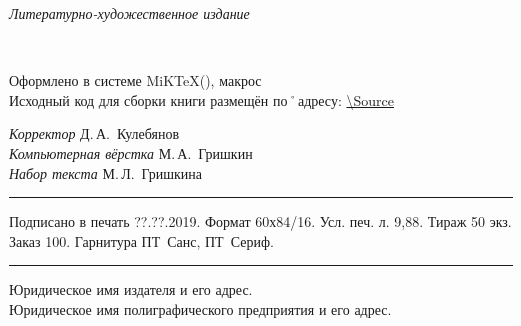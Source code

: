 ﻿\clearpage

\thispagestyle{empty}
\noindent\begin{center}
	{\itshape Литературно-художественное издание\par}
\end{center}	
\vfill\noindent
\begin{center}
	{\large{\bfseries\MakeUppercase{\AuthorFam}} \AuthorName\\[3ex]}	
	{\LARGE\Title}
\end{center}

\vfill\noindent
\begin{center}
	Оформлено в системе MiK\TeX(\LaTeXe), макрос \KOMAScript\\[1ex]
	Исходный код для сборки книги размещён по˚адресу: \footnotesize\url{\Source}
\end{center}
	
\vfill\noindent
\begin{center}
	\small 
	{\itshape Корректор} Д.\,А.~Кулебянов\\[1ex]
	{\itshape Компьютерная вёрстка} М.\,А.~Гришкин\\[1ex]
	{\itshape Набор текста} М.\,Л.~Гришкина\\[1ex]
\end{center}

\vfill\noindent
\rule{\textwidth}{.5pt}
\begin{center}
	\small Подписано в печать  ??.??.2019. Формат 60х84/16. Усл. печ. л. 9,88. Тираж 50 экз. Заказ 100. Гарнитура ПТ~Санс, ПТ~Сериф.		
\end{center}
\rule{\textwidth}{.5pt}

\vfil\noindent		
\begin{center}
		\small
		
		Юридическое имя издателя и его адрес.\\[1ex]
				
		Юридическое имя полиграфического предприятия и его адрес.
\end{center}

